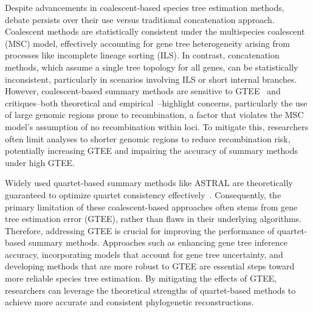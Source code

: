 \documentclass[10pt,a4paper]{article}
\begin{document}
Despite advancements in coalescent-based species tree estimation methods, debate persists over their use versus traditional concatenation approach. Coalescent methods are statistically consistent under the multispecies coalescent (MSC) model, effectively accounting for gene tree heterogeneity arising from processes like incomplete lineage sorting (ILS). In contrast, concatenation methods, which assume a single tree topology for all genes, can be statistically inconsistent, particularly in scenarios involving ILS or short internal branches. However, coalescent-based summary methods are sensitive to GTEE~\cite{bayzid2013naive,bayzid2015weighted,bossert2021gene,xi2015genetreeerror,roch-gtee-robust,meiklejohn2016analysis} and critiques--both theoretical and empirical~\cite{gatesy2013concatenation,gatesy2014phylogenetic,springer2016gene}--highlight concerns, particularly the use of large genomic regions  prone to recombination, a factor that violates the MSC model's assumption of no recombination within loci. To mitigate this, researchers often limit analyses to shorter genomic regions to reduce recombination risk, potentially increasing GTEE and impairing the accuracy of summary methods under high GTEE.


Widely used quartet-based summary methods like ASTRAL are theoretically guaranteed to optimize quartet consistency effectively~\cite{astral}. Consequently, the primary limitation of these coalescent-based approaches often stems from gene tree estimation error (GTEE), rather than flaws in their underlying algorithms. Therefore, addressing GTEE is crucial for improving the performance of quartet-based summary methods. Approaches such as enhancing gene tree inference accuracy, incorporating models that account for gene tree uncertainty, and developing methods that are more robust to GTEE are essential steps toward more reliable species tree estimation. By mitigating the effects of GTEE, researchers can leverage the theoretical strengths of quartet-based methods to achieve more accurate and consistent phylogenetic reconstructions.
\end{document}
